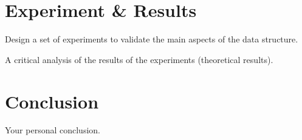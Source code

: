 \documentclass[12pt, a4paper]{article} %
\begin{document}
\section{Experiment \& Results}%
\label{sec:experiment}

Design a set of experiments to validate the main aspects of the data structure.

A critical analysis of the results of the experiments (theoretical results).




















\section{Conclusion}%
\label{sec:conclusion}

Your personal conclusion.
























\end{document}
